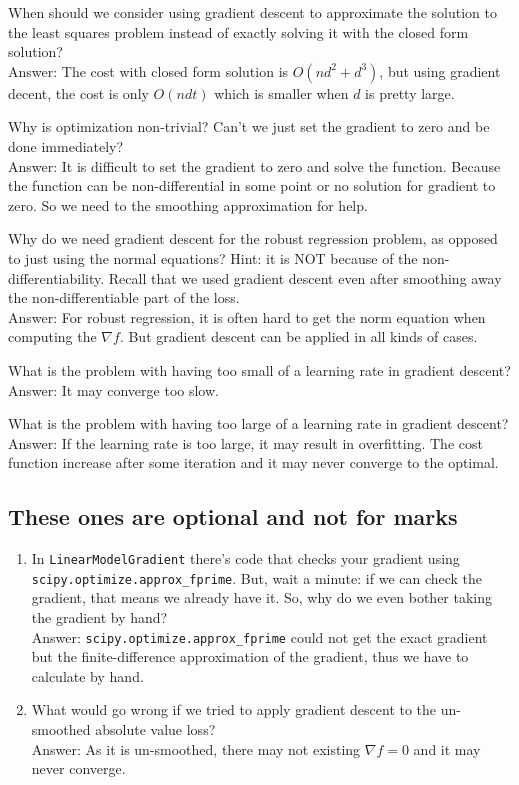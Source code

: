 \documentclass{article}
\def\enum#1{\begin{enumerate}#1\end{enumerate}}
\begin{document}
{\item When should we consider using gradient descent to approximate the solution to the least squares problem instead of exactly solving it with the closed form solution?
\textcolor{gre}{\\Answer: The cost with closed form solution is $O(nd^2+d^3)$, but using gradient decent, the cost is only $O(ndt)$ which is smaller when $d$ is pretty large. }
\item Why is optimization non-trivial? Can't we just set the gradient to zero and be done immediately?
\textcolor{gre}{\\Answer: It is difficult to set the gradient to zero and solve the function. Because the function can be non-differential in some point or no solution for gradient to zero. So we need to the smoothing approximation for help. }
\item Why do we need gradient descent for the robust regression problem, as opposed to just using the normal equations? Hint: it is NOT because of the non-differentiability. Recall that we used gradient descent even after smoothing away the non-differentiable part of the loss.
\textcolor{gre}{\\Answer: For robust regression, it is often hard to get the norm equation when computing the $\nabla f$. But gradient descent can be applied in all kinds of cases.}
\item What is the problem with having too small of a learning rate in gradient descent?
\textcolor{gre}{\\Answer: It may converge too slow.}
\item What is the problem with having too large of a learning rate in gradient descent?
\textcolor{gre}{\\Answer: If the learning rate is too large, it may result in overfitting. The cost function increase after some iteration and it may never converge to the optimal.}
}

\subsection{These ones are optional and not for marks}

\enum{
\item In \texttt{LinearModelGradient} there's code that checks your gradient using \texttt{scipy.optimize.approx\_fprime}. But, wait a minute: if we can check the gradient, that means we already have it. So, why do we even bother taking the gradient by hand?
\textcolor{gre}{\\Answer: \texttt{scipy.optimize.approx\_fprime} could not get the exact gradient but the finite-difference approximation of the gradient, thus we have to calculate by hand. }
\item What would go wrong if we tried to apply gradient descent to the un-smoothed absolute value loss?
\textcolor{gre}{\\Answer: As it is un-smoothed, there may not existing $\nabla f=0$ and it may never converge.}
}
\end{document}
